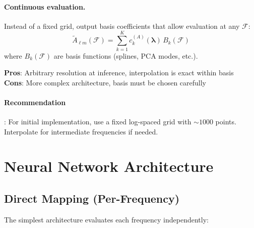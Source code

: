 \documentclass[11pt,a4paper]{article}
\newcommand{\Atlm}{\tilde{A}_{\ell m}}
\newcommand{\Philm}{\Phi_{\ell m}}
\newcommand{\veclambda}{\bm{\lambda}}
\newcommand{\Mf}{\mathcal{F}}
\begin{document}
\paragraph{Continuous evaluation.}
Instead of a fixed grid, output basis coefficients that allow evaluation at any $\Mf$:
\begin{equation}
    \Atlm(\Mf) = \sum_{k=1}^{K} c^{(A)}_k(\veclambda) \, B_k(\Mf)
\end{equation}
where $B_k(\Mf)$ are basis functions (splines, PCA modes, etc.).

\textbf{Pros}: Arbitrary resolution at inference, interpolation is exact within basis \\
\textbf{Cons}: More complex architecture, basis must be chosen carefully

\paragraph{Recommendation}: For initial implementation, use a fixed log-spaced grid with $\sim 1000$ points. Interpolate for intermediate frequencies if needed.

\section{Neural Network Architecture}
\label{sec:architecture}

\subsection{Direct Mapping (Per-Frequency)}
\label{sec:arch_direct}

The simplest architecture evaluates each frequency independently:

\begin{center}
\end{center}
\end{document}
